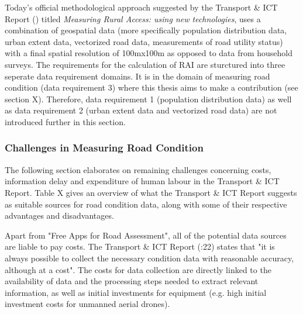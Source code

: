                 \medskip
                
                Today's official methodological approach suggested by the Transport \& ICT Report (\citeyear{transportict2016}) titled \textit{Measuring Rural Access: using new technologies}, uses a combination of geospatial data (more specifically population distribution data, urban extent data, vectorized road data, measurements of road utility status) with a final spatial resolution of 100mx100m as opposed to data from household surveys. The requirements for the calculation of RAI are sturctured into three seperate data requirement domains. It is in the domain of measuring road condition (data requirement 3) where this thesis aims to make a contribution (see section X). Therefore, data requirement 1 (population distribution data) as well as data requirement 2 (urban extent data and vectorized road data) are not introduced further in this section.  
                \medskip
                
                
            \subsubsection{Challenges in Measuring Road Condition}
            
                The following section elaborates on remaining challenges concerning costs, information delay and expenditure of human labour in the Transport \& ICT Report. Table X gives an overview of what the Transport \& ICT Report suggests as suitable sources for road condition data, along with some of their respective advantages and disadvantages.
                
                \medskip
                
                Apart from "Free Apps for Road Assessment", all of the potential data sources are liable to pay costs. The Transport \& ICT Report (\citeyear{transportict2016}:22) states that "it is always possible to collect the necessary condition data with reasonable accuracy, although at a cost". The costs for data collection are directly linked to the availability of data and the processing steps needed to extract relevant information, as well as initial investments for equipment (e.g. high initial investment costs for unmanned aerial drones).
              
                
                
                \medskip
                
